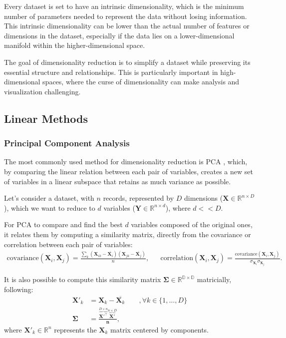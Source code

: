     Every dataset is set to have an intrinsic dimensionality, which is the minimum number of parameters needed to represent the data without losing information. This intrinsic dimensionality can be lower than the actual number of features or dimensions in the dataset, especially if the data lies on a lower-dimensional manifold within the higher-dimensional space.

    The goal of dimensionality reduction is to simplify a dataset while preserving its essential structure and relationships. This is particularly important in high-dimensional spaces, where the curse of dimensionality can make analysis and visualization challenging.

    \subsection{Linear Methods}
        \subsubsection{Principal Component Analysis}
            The most commonly used method for dimensionality reduction is \ac{PCA} \cite{pca}, which, by comparing the linear relation between each pair of variables, creates a new set of variables in a linear subspace that retains as much variance as possible.

            Let's consider a dataset, with $n$ records, represented by $D$ dimensions ($\boldsymbol{X}\in\mathbb{R}^{n\times D}$), which we want to reduce to $d$ variables ($\boldsymbol{Y}\in\mathbb{R}^{n\times d}$), where $d << D$.

            For \ac{PCA} to compare and find the best $d$ variables composed of the original ones, it relates them by computing a similarity matrix, directly from the covariance or correlation between each pair of variables:
            \begin{align}
                \text{covariance}(\boldsymbol{X}_i, \boldsymbol{X}_j) = \frac{\sum_k (\boldsymbol{X}_{ik} - \overline{\boldsymbol{X}_i})(\boldsymbol{X}_{jk} - \overline{\boldsymbol{X}_j})}{n}, &&
                \text{correlation}(\boldsymbol{X}_i, \boldsymbol{X}_j) = \frac{\text{covariance}(\boldsymbol{X}_i, \boldsymbol{X}_j)}{\sigma_{\boldsymbol{X}_i}\sigma_{\boldsymbol{X}_j}}.
            \end{align}
            
            It is also possible to compute this similarity matrix $\boldsymbol{\Sigma}\in\mathbb{R^{D\times D}}$ matricially, following:
            \begin{align}
                \boldsymbol{X'}_k & = \boldsymbol{X}_k - \overline{\boldsymbol{X}_k} \qquad, \forall k \in \{1, \ldots, D\} \\
                \boldsymbol{\Sigma} & = \frac{\overbrace{\boldsymbol{X'}^\top}^{D\times n}\overbrace{\boldsymbol{X'}}^{n\times D}}{\boldsymbol{n}},
                \label{eq:Sigma}
            \end{align}
            where $\boldsymbol{X'}_k\in\mathbb{R}^n$ represents the $\boldsymbol{X}_k$ matrix centered by components. \\
            
